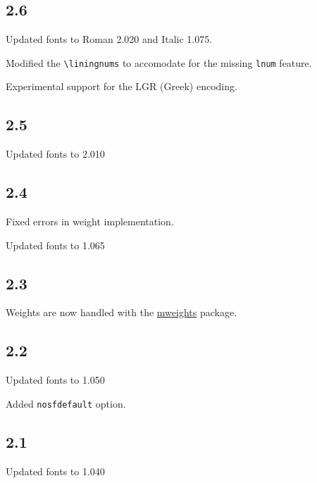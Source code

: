 \documentclass[10pt,a4paper,english]{article}
\begin{document}
\begin{multicols}{2}
\subsection*{2.6}
\begin{itemize*}
	\item Updated fonts to Roman 2.020 and Italic 1.075.
	\item Modified the \texttt{\textbackslash liningnums} to accomodate for the missing \texttt{lnum} feature.
	\item Experimental support for the LGR (Greek) encoding.
\end{itemize*}

\subsection*{2.5}
\begin{itemize*}
	\item Updated fonts to 2.010
\end{itemize*}

\subsection*{2.4}
\begin{itemize*}
	\item Fixed errors in weight implementation.
	\item Updated fonts to 1.065
\end{itemize*}

\subsection*{2.3}
\begin{itemize*}
	\item Weights are now handled with the \href{http://www.ctan.org/pkg/mweights}{mweights} package.
\end{itemize*}

\subsection*{2.2}
\begin{itemize*}
	\item Updated fonts to 1.050
	\item Added \texttt{nosfdefault} option.
\end{itemize*}

\subsection*{2.1}
\begin{itemize*}
	\item Updated fonts to 1.040
\end{itemize*}


\end{multicols}
\end{document}
